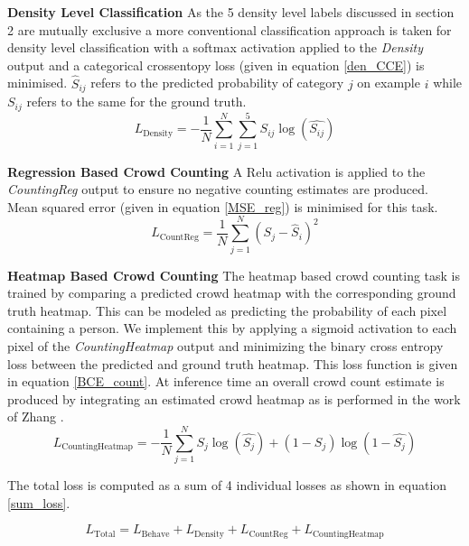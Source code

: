 \documentclass[10pt,twocolumn,letterpaper]{article}
\begin{document}
\textbf{Density Level Classification}
As the 5 density level labels discussed in section 2 are mutually exclusive a more conventional classification approach is taken for density level classification with a softmax activation applied to the \textit{Density} output and a categorical crossentopy loss (given in equation \ref{den_CCE}) is minimised. $\hat{S}_{ij}$ refers to the predicted probability of category $j$ on example $i$ while $S_{ij}$ refers to the same for the ground truth. 
\begin{equation}
L_{\text{Density}}=-\frac{1}{N}\sum_{i=1}^{N} \sum_{j=1}^5 S_{ij}\log(\hat{S_{ij}})
\label{den_CCE}
\end{equation}


\textbf{Regression Based Crowd Counting}
A Relu activation is applied to the \textit{CountingReg} output to ensure no negative counting estimates are produced. Mean squared error (given in equation \ref{MSE_reg}) is minimised for this task.
\begin{equation}
L_{\text{CountReg}}={\frac{1}{N}\sum_{j=1}^{N}( S_{j}-\hat{S}_{i}  )^{2} }
\label{MSE_reg}
\end{equation}


\textbf{Heatmap Based Crowd Counting}
The heatmap based crowd counting task is trained by comparing a predicted crowd heatmap with the corresponding ground truth heatmap. This can be modeled as predicting the probability of each pixel containing a person. We implement this by applying a sigmoid activation to each pixel of the \textit{CountingHeatmap} output and minimizing the binary cross entropy loss between the predicted and ground truth heatmap. This loss function is given in equation \ref{BCE_count}. At inference time an overall crowd count estimate is produced by integrating an estimated crowd heatmap as is performed in the work of Zhang \etal \cite{zhang2016single}.
\begin{equation}
L_{\text{CountingHeatmap}}=-\frac{1}{N}\sum_{j=1}^{N}S_{j}\log(\hat{S_{j}})+(1-S_{j})\log(1-\hat{S_{j}})
\label{BCE_count}
\end{equation}

The total loss is computed as a sum of 4 individual losses as shown in equation \ref{sum_loss}.

\begin{equation}
L_{\text{Total}}=L_{\text{Behave}}+L_{\text{Density}}+L_{\text{CountReg}}+L_{\text{CountingHeatmap}}
\label{sum_loss}
\end{equation}
\end{document}
